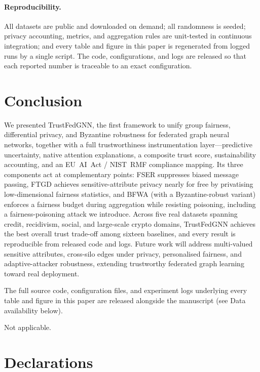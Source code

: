 \documentclass[pdflatex,sn-mathphys-num]{sn-jnl}
\theoremstyle{thmstyleone}%
\theoremstyle{thmstyletwo}%
\theoremstyle{thmstylethree}%
\begin{document}
\paragraph{Reproducibility.}
All datasets are public and downloaded on demand; all randomness is seeded;
privacy accounting, metrics, and aggregation rules are unit-tested in continuous
integration; and every table and figure in this paper is regenerated from logged
runs by a single script. The code, configurations, and logs are released so that
each reported number is traceable to an exact configuration.

\section{Conclusion}
\label{sec:conclusion}

We presented TrustFedGNN, the first framework to unify group fairness,
differential privacy, and Byzantine robustness for federated graph neural
networks, together with a full trustworthiness instrumentation layer---predictive
uncertainty, native attention explanations, a composite trust score,
sustainability accounting, and an EU~AI~Act / NIST~RMF compliance mapping. Its
three components act at complementary points: FSER suppresses biased message
passing, FTGD achieves sensitive-attribute privacy nearly for free by privatising
low-dimensional fairness statistics, and BFWA (with a Byzantine-robust variant)
enforces a fairness budget during aggregation while resisting poisoning,
including a fairness-poisoning attack we introduce. Across five real datasets
spanning credit, recidivism, social, and large-scale crypto domains, TrustFedGNN
achieves the best overall trust trade-off among sixteen baselines, and every result
is reproducible from released code and logs. Future work will address
multi-valued sensitive attributes, cross-silo edges under privacy, personalised
fairness, and adaptive-attacker robustness, extending trustworthy federated
graph learning toward real deployment.


\backmatter

The full source code, configuration files, and experiment logs underlying
every table and figure in this paper are released alongside the manuscript
(see Data availability below).

Not applicable.

\section*{Declarations}
\end{document}
